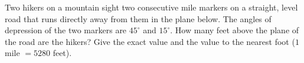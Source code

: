 Two hikers on a mountain sight two consecutive mile markers on a straight, level road that runs directly away from them in the plane below. The angles of depression of the two markers are $45^\circ$ and $15^\circ$. How many feet above the plane of the road are the hikers? Give the exact value and the value to the nearest foot ($1$ mile $=5280$ feet).
